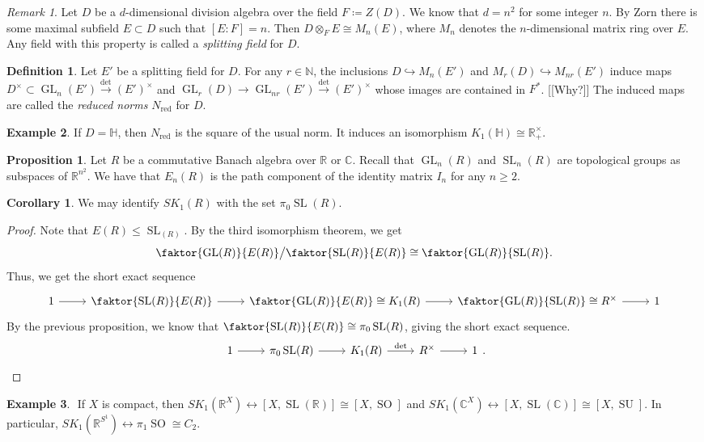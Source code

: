 \documentclass[10pt,letterpaper,cm]{nupset}
\theoremstyle{definition}
\newtheorem{definition}{Definition}
\newtheorem{exmp}[definition]{Example}
\theoremstyle{theorem}
\newtheorem{prop}[theorem]{Proposition}
\newtheorem{corollary}[theorem]{Corollary}
\theoremstyle{remark}
\newtheorem{remark}{Remark}
\newcommand{\C}{\mathbb C}
\renewcommand{\H}{\mathbb H}
\newcommand{\N}{\mathbb N}
\newcommand{\R}{\mathbb R}
\newcommand{\1}{\mathbf{1}}
\newcommand{\0}{\vec 0}
\DeclareMathOperator*{\GL}{GL}
\DeclareMathOperator*{\SL}{SL}
\DeclareMathOperator*{\SO}{SO}
\DeclareMathOperator*{\SU}{SU}
\DeclareMathOperator{\red}{red}
\begin{document}
\begin{remark}
Let $D$ be a $d$-dimensional division algebra over the field $F\coloneqq Z(D)$. We know that $d =n^2$ for some integer $n$. By Zorn there is some maximal subfield $E\subset D$ such that $[E : F] = n$. Then $D \otimes_F E \cong M_n(E)$, where $M_n$ denotes the $n$-dimensional matrix ring over $E$. Any field with this property is called a \textit{splitting field} for $D$.
\end{remark}

\begin{definition}
Let $E'$ be a splitting field for $D$. For any $r \in \N$, the inclusions $D \hookrightarrow M_n(E')$ and $M_r(D) \hookrightarrow M_{nr}(E')$ induce maps $D^{\times}\subset \GL_n(E') \overset{\det}{\longrightarrow} (E')^{\times}$ and $\GL_r(D)\to \GL_{nr}(E')  \overset{\det}{\longrightarrow} (E')^{\times}$ whose images are contained in $F^{\ast}$. {[[Why?]]} The induced maps are called the \textit{reduced norms} $N_{\red}$ for $D$.
\end{definition}

\begin{exmp}
If $D = \H$, then $N_{\red}$ is the square of the usual norm. It induces an isomorphism $K_1(\H) \cong \R_+^{\times}$.
\end{exmp}

\begin{prop}
Let $R$ be a commutative Banach algebra over $\R$ or $\C$. Recall that $\GL_n(R)$ and $\SL_n(R)$ are topological groups as subspaces of $\R^{n^2}$. We have that $E_n(R)$ is the path component of the identity matrix $I_n$ for any $n\geq 2$.
\end{prop}

\begin{corollary}
We may identify $SK_1(R)$ with the set $\pi_0\SL(R)$. 
\end{corollary}
\begin{proof}
Note that $E(R)\leq \SL_(R)$. By the third isomorphism theorem, we get $$ \faktor{\GL(R)}{E(R)}\big / \faktor{\SL(R)}{E(R)} \cong \faktor{\GL(R)}{\SL(R)}.$$ Thus, we get the short exact sequence 
\[
\begin{tikzcd}
1 \arrow[r] & \faktor{\SL(R)}{E(R)} \arrow[r] & \faktor{\GL(R)}{E(R)}\cong K_1(R) \arrow[r] & \faktor{\GL(R)}{\SL(R)} \cong R^{\times} \arrow[r] & 1
\end{tikzcd}
\]
By the previous proposition, we know that $\faktor{\SL(R)}{E(R)} \cong \pi_0\SL(R)$, giving the short exact sequence.
\[
\begin{tikzcd}
1 \arrow[r] & \pi_0\SL(R) \arrow[r] & K_1(R) \arrow[r, "\det"] & R^{\times} \arrow[r] & 1
\end{tikzcd}.
\]
\end{proof}
\begin{exmp} $ $
If $X$ is compact, then $SK_1(\R^X) \leftrightarrow [X, \SL(\R)] \cong [X, \SO]$ and $SK_1(\C^X) \leftrightarrow [X, \SL(\C)] \cong [X, \SU]$.
In particular, $SK_1(\R^{S^1}) \leftrightarrow \pi_1 \SO \cong C_2$.
\end{exmp}
\end{document}
